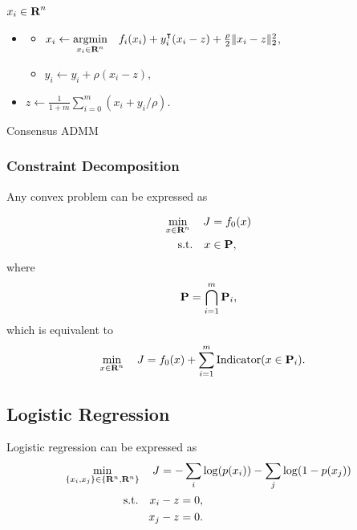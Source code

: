\documentclass{article}
\begin{document}
    \begin{algorithm}[H]
        \SetAlgoLined
        $x_i\in\textbf{R}^n$\\
        {
            \begin{itemize}
                \item 
                {
                    \begin{itemize}\ListBullet
                        \item 
                        $x_i\leftarrow \underset{x_i\in\textbf{R}^n}{\text{argmin}} \quad f_i(x_i)
                        +y_i^\intercal(x_i-z)
                        +\frac{\rho}{2}\|x_i-z\|_2^2$,
                        \item 
                        $y_i\leftarrow y_i+\rho (x_i-z)$,
                    \end{itemize}
                }  
                \item $z\leftarrow \frac{1}{1+m}\sum_{i=0}^{m}(x_i+y_i/\rho)$.
            \end{itemize}
        }
    \caption{Consensus ADMM}
    \label{algo:ADMM_consensus}
    \end{algorithm}

\subsubsection{Constraint Decomposition}

    Any convex problem can be expressed as

    \begin{align*}
        \min_{x\in\textbf{R}^n}\quad J&=f_0(x)\\
        \text{s.t.}\quad x&\in \textbf{P},
    \end{align*}
    where
    \begin{align*}
        \textbf{P} = \bigcap_{i=1}^m \textbf{P}_i,
    \end{align*}
    which is equivalent to
    \begin{align*}
        \min_{x\in\textbf{R}^n}\quad J&=f_0(x)+\sum_{i=1}^m \text{Indicator}(x\in \textbf{P}_i).
    \end{align*}

\subsection{Logistic Regression}

    Logistic regression can be expressed as
    \begin{align*}
        \min_{\{x_i,x_j\}\in\{\textbf{R}^n,\textbf{R}^n\}}\quad J &= -\sum_i \log(p(x_i))-\sum_j\log(1-p(x_j))\\
        \text{s.t.}\quad x_i&-z=0,\\
        x_j&-z=0.
    \end{align*}
\end{document}
